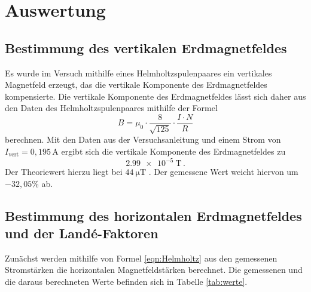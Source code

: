 \newpage
\section{Auswertung}
\label{sec:Auswertung}

\subsection{Bestimmung des vertikalen Erdmagnetfeldes}
\label{subsec:vertikal}

Es wurde im Versuch mithilfe eines Helmholtzspulenpaares ein vertikales Magnetfeld
erzeugt, das die vertikale Komponente des Erdmagnetfeldes kompensierte. Die vertikale
Komponente des Erdmagnetfeldes lässt sich daher aus den Daten des Helmholtzspulenpaares
mithilfe der Formel
\begin{equation}
    B= \mu_0 \cdot  \frac{8}{\sqrt {125}}\cdot \frac{I\cdot N}{R}
    \label{eqn:Helmholtz}
\end{equation}
berechnen. Mit den Daten aus der Versuchsanleitung \cite{Versuchsanleitung} und einem Strom von
$I_{\text{vert}}=0{,}195\,$A ergibt sich die vertikale Komponente des Erdmagnetfeldes zu
\begin{equation*}
  \SI{2.99e-5}{\tesla}\,.
\end{equation*}
Der Theoriewert hierzu liegt bei $\SI{44}{\micro\tesla}$ \cite{erde}. Der gemessene Wert
weicht hiervon um $-32{,}05\%$ ab.

\subsection{Bestimmung des horizontalen Erdmagnetfeldes und der Landé-Faktoren}
\label{subsec:horizontal}

Zunächst werden mithilfe von Formel \eqref{eqn:Helmholtz} aus den gemessenen Stromstärken
die horizontalen Magnetfeldstärken berechnet. Die gemessenen und die daraus berechneten Werte befinden sich
in Tabelle \ref{tab:werte}.

